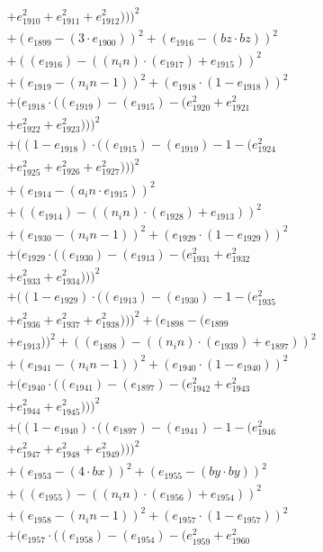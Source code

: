 \documentclass[10pt, a4paper]{article}
\begin{document}
\begin{align*}
& + e_{1910}^{2} + e_{1911}^{2} + e_{1912}^{2})))^{2} \\
& + (e_{1899} - (3  \cdot  e_{1900}))^{2} + (e_{1916} - (bz  \cdot  bz))^{2} \\
& + ((e_{1916}) - ((n_in)  \cdot  (e_{1917}) + e_{1915}))^{2} \\
& + (e_{1919} - (n_in - 1))^{2} + (e_{1918}  \cdot  (1 - e_{1918}))^{2} \\
& + (e_{1918}  \cdot  ((e_{1919}) - (e_{1915}) - (e_{1920}^{2} + e_{1921}^{2} \\
& + e_{1922}^{2} + e_{1923}^{2})))^{2} \\
& + ((1 - e_{1918})  \cdot  ((e_{1915}) - (e_{1919}) - 1 - (e_{1924}^{2} \\
& + e_{1925}^{2} + e_{1926}^{2} + e_{1927}^{2})))^{2} \\
& + (e_{1914} - (a_in  \cdot  e_{1915}))^{2} \\
& + ((e_{1914}) - ((n_in)  \cdot  (e_{1928}) + e_{1913}))^{2} \\
& + (e_{1930} - (n_in - 1))^{2} + (e_{1929}  \cdot  (1 - e_{1929}))^{2} \\
& + (e_{1929}  \cdot  ((e_{1930}) - (e_{1913}) - (e_{1931}^{2} + e_{1932}^{2} \\
& + e_{1933}^{2} + e_{1934}^{2})))^{2} \\
& + ((1 - e_{1929})  \cdot  ((e_{1913}) - (e_{1930}) - 1 - (e_{1935}^{2} \\
& + e_{1936}^{2} + e_{1937}^{2} + e_{1938}^{2})))^{2} + (e_{1898} - (e_{1899} \\
& + e_{1913}))^{2} + ((e_{1898}) - ((n_in)  \cdot  (e_{1939}) + e_{1897}))^{2} \\
& + (e_{1941} - (n_in - 1))^{2} + (e_{1940}  \cdot  (1 - e_{1940}))^{2} \\
& + (e_{1940}  \cdot  ((e_{1941}) - (e_{1897}) - (e_{1942}^{2} + e_{1943}^{2} \\
& + e_{1944}^{2} + e_{1945}^{2})))^{2} \\
& + ((1 - e_{1940})  \cdot  ((e_{1897}) - (e_{1941}) - 1 - (e_{1946}^{2} \\
& + e_{1947}^{2} + e_{1948}^{2} + e_{1949}^{2})))^{2} \\
& + (e_{1953} - (4  \cdot  bx))^{2} + (e_{1955} - (by  \cdot  by))^{2} \\
& + ((e_{1955}) - ((n_in)  \cdot  (e_{1956}) + e_{1954}))^{2} \\
& + (e_{1958} - (n_in - 1))^{2} + (e_{1957}  \cdot  (1 - e_{1957}))^{2} \\
& + (e_{1957}  \cdot  ((e_{1958}) - (e_{1954}) - (e_{1959}^{2} + e_{1960}^{2} \\

\end{align*}
\end{document}
